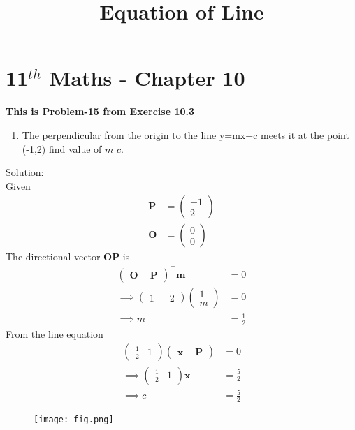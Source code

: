 \documentclass[journel,12pt,twocolumn]{article}
\newcommand{\myvec}[1]{\ensuremath{\begin{pmatrix}#1\end{pmatrix}}}
\let\vec\mathbf
\begin{document}
\begin{center}
\title{\textbf{Equation of Line}}
\date{\vspace{-5ex}} %
\maketitle
\end{center}
\section{11$^{th}$ Maths - Chapter 10}
\textbf{This is Problem-15 from Exercise 10.3}
\begin{enumerate}
\item The perpendicular from the origin to the line y=mx+c meets it at the point (-1,2) find value of $m$ $c$.
\end{enumerate}
Solution:
\\
Given
\begin{align}
\vec{P}&=\myvec{-1\\2}\\
\vec{O}&=\myvec{0\\0}
\end{align}
The directional vector $\vec{OP}$ is 
\begin{align}
\myvec{\vec{O}-\vec{P}}^{\top}\vec{m}&=0\\
\implies\myvec{1&-2}\myvec{1\\m}&=0\\
\implies m&=\frac{1}{2}
\end{align}
From the line equation 
\begin{align}
\myvec{\frac{1}{2}&1}\myvec{\vec{x}-\vec{P}}&=0\\
\implies\myvec{\frac{1}{2}&1}\vec{x}&=\frac{5}{2}\\
\implies c&=\frac{5}{2}
\end{align}
\begin{figure}[!h]
\centering
\texttt{[image: fig.png]}
\caption{}
  \label{fig:Figure}
\end{figure}
\end{document}

